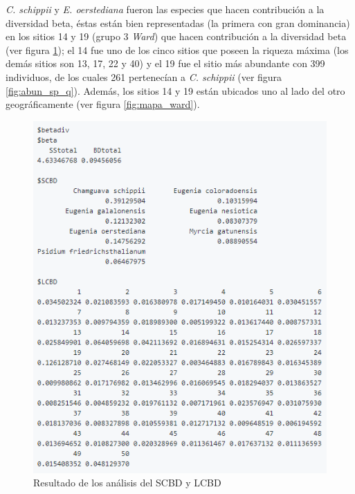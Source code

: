 \documentclass[11pt,]{article}
\begin{document}
\emph{C. schippii} y \emph{E. oerstediana} fueron las especies que hacen
contribución a la diversidad beta, éstas están bien representadas (la
primera con gran dominancia) en los sitios 14 y 19 (grupo 3 \emph{Ward})
que hacen contribución a la diversidad beta (ver figura
\ref{fig:beta_div}); el 14 fue uno de los cinco sitios que poseen la
riqueza máxima (los demás sitios son 13, 17, 22 y 40) y el 19 fue el
sitio más abundante con 399 individuos, de los cuales 261 pertenecían a
\emph{C. schippii} (ver figura \ref{fig:abun_sp_q}). Además, los sitios
14 y 19 están ubicados uno al lado del otro geográficamente (ver figura
\ref{fig:mapa_ward}).

\begin{figure}
\centering
\includegraphics{beta_div.png}
\caption{Resultado de los análisis del SCBD y LCBD\label{fig:beta_div}}
\end{figure}
\end{document}
